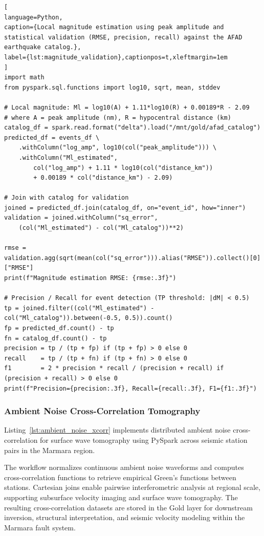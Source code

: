 \documentclass[data,article,accept,pdftex,moreauthors]{Definitions/mdpi}
\begin{document}
\begin{lstlisting}[
language=Python,
caption={Local magnitude estimation using peak amplitude and statistical validation (RMSE, precision, recall) against the AFAD earthquake catalog.},
label={lst:magnitude_validation},captionpos=t,xleftmargin=1em
]
import math
from pyspark.sql.functions import log10, sqrt, mean, stddev

# Local magnitude: Ml = log10(A) + 1.11*log10(R) + 0.00189*R - 2.09
# where A = peak amplitude (nm), R = hypocentral distance (km)
catalog_df = spark.read.format("delta").load("/mnt/gold/afad_catalog")
predicted_df = events_df \
    .withColumn("log_amp", log10(col("peak_amplitude"))) \
    .withColumn("Ml_estimated",
        col("log_amp") + 1.11 * log10(col("distance_km"))
        + 0.00189 * col("distance_km") - 2.09)

# Join with catalog for validation
joined = predicted_df.join(catalog_df, on="event_id", how="inner")
validation = joined.withColumn("sq_error",
    (col("Ml_estimated") - col("Ml_catalog"))**2)

rmse = validation.agg(sqrt(mean(col("sq_error"))).alias("RMSE")).collect()[0]["RMSE"]
print(f"Magnitude estimation RMSE: {rmse:.3f}")

# Precision / Recall for event detection (TP threshold: |dM| < 0.5)
tp = joined.filter((col("Ml_estimated") - col("Ml_catalog")).between(-0.5, 0.5)).count()
fp = predicted_df.count() - tp
fn = catalog_df.count() - tp
precision = tp / (tp + fp) if (tp + fp) > 0 else 0
recall    = tp / (tp + fn) if (tp + fn) > 0 else 0
f1        = 2 * precision * recall / (precision + recall) if (precision + recall) > 0 else 0
print(f"Precision={precision:.3f}, Recall={recall:.3f}, F1={f1:.3f}")
\end{lstlisting}

\subsubsection{Ambient Noise Cross-Correlation Tomography}

Listing~\ref{lst:ambient_noise_xcorr} implements distributed ambient noise cross-correlation for surface wave tomography using PySpark across seismic station pairs in the Marmara region. 

The workflow normalizes continuous ambient noise waveforms and computes cross-correlation functions to retrieve empirical Green's functions between stations. Cartesian joins enable pairwise interferometric analysis at regional scale, supporting subsurface velocity imaging and surface wave tomography. The resulting cross-correlation datasets are stored in the Gold layer for downstream inversion, structural interpretation, and seismic velocity modeling within the Marmara fault system.
\end{document}
